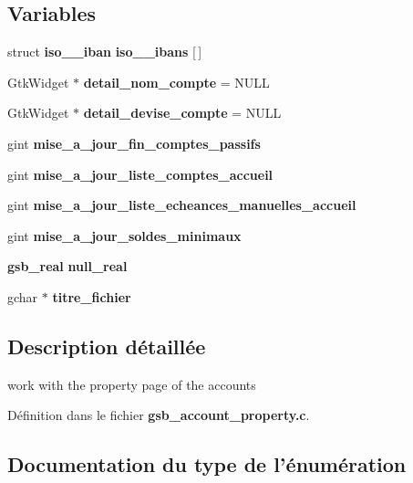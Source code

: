 \subsection*{Variables}
\begin{DoxyCompactItemize}
\item 
struct {\bf iso\_\_\-iban} {\bf iso\_\_\-ibans} [$\,$]
\item 
GtkWidget $\ast$ {\bf detail\_\-nom\_\-compte} = NULL
\item 
GtkWidget $\ast$ {\bf detail\_\-devise\_\-compte} = NULL
\item 
gint {\bf mise\_\-a\_\-jour\_\-fin\_\-comptes\_\-passifs}
\item 
gint {\bf mise\_\-a\_\-jour\_\-liste\_\-comptes\_\-accueil}
\item 
gint {\bf mise\_\-a\_\-jour\_\-liste\_\-echeances\_\-manuelles\_\-accueil}
\item 
gint {\bf mise\_\-a\_\-jour\_\-soldes\_\-minimaux}
\item 
{\bf gsb\_\-real} {\bf null\_\-real}
\item 
gchar $\ast$ {\bf titre\_\-fichier}
\end{DoxyCompactItemize}


\subsection{Description détaillée}
work with the property page of the accounts 

Définition dans le fichier {\bf gsb\_\-account\_\-property.c}.



\subsection{Documentation du type de l'énumération}
